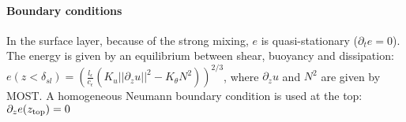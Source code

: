 
\paragraph{Boundary conditions}
In the surface layer, because of the strong mixing, $e$ is
quasi-stationary ($\partial_t e = 0$). The energy is given by
an equilibrium between shear, buoyancy and dissipation:
$e(z<\delta_{sl}) = \left(\frac{l_\epsilon}{c_\epsilon}
(K_u||\partial_z u||^2 - K_\theta N^2)\right)^{2/3}$, where
$\partial_z u$ and $N^2$ are given by MOST.
A homogeneous Neumann boundary condition is used at the top:
$\partial_z e (z_{\rm top}) = 0$

